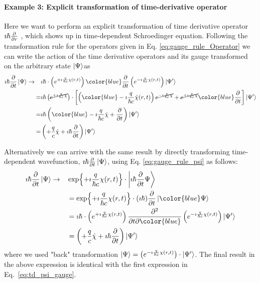 \documentclass[11pt]{article}
\begin{document}
\paragraph{Example 3: Explicit transformation of time-derivative operator}

Here we want to perform an explicit transformation of time derivative operator $\imath \hbar \pdv{}{r}$ , which shows up  in time-dependent  Schroedinger equation.
 Following the     transformation rule for the operators given in Eq. \ref{eq:gauge_rule_Operator} we can write  the action of the time derivative operators and its gauge transformed  on the arbitrary state  $\ket{\Psi}$as 
\begin{align}
 \label{eq:td_psi_gauge}  \imath \hbar \pdv{}{t} \ket{\Psi} \to \quad&
       \imath \hbar \cdot  \left( e^{+\imath \frac{q}{\hbar c} \chi(r,t)} \right) {\color{blue} \pdv{}{t} } \left( e^{-\imath \frac{q}{\hbar c} \chi(r,t)}  \right)  \ket{\Psi'}\\ \nonumber
=& \imath \hbar\left( \cancel{ e^{+\imath \frac{q}{\hbar c} \chi }} \right) \cdot
       \left[ \left({\color{blue} -\imath \frac{q}{\hbar c} \dot \chi(r,t)  }\right) \cancel{ e^{-\imath \frac{q}{\hbar c} \chi}}  + \cancel{e^{+\imath \frac{q}{\hbar c} \chi}} {\color{blue} \pdv{}{t} }  \right] \ket{\Psi'} \\ \nonumber
=& \imath \hbar\left({\color{blue} -\imath \frac{q}{\hbar c} \dot \chi +\pdv{}{t} }   \right) \ket{\Psi'}  \\ \nonumber 
=& \left( +\frac{q}{c} \dot \chi + \imath \hbar \pdv{}{t} \right) \ket{ \Psi'}
\end{align}

Alternatively we can arrive with the same result by directly transforming  time-dependent wavefunction, $\imath \hbar\pdv{}{t}\ket{\Psi}$, using Eq. \ref{eq:gauge_rule_psi} as follows:
\begin{align*}
   \imath \hbar \pdv{}{t} \ket{\Psi} \to \quad&
 \exp{+\imath \frac{q}{\hbar c} \chi(r,t)}  \cdot \ket{ \imath \hbar \pdv{}{t} \Psi }  \\ 
 & =\exp{+\imath \frac{q}{\hbar c} \chi(r,t)} \cdot (\imath \hbar) \pdv{}{t} \ket{\color{blue}\Psi} 
\\&  =  %
       \imath \hbar \cdot  \left( e^{+\imath \frac{q}{\hbar c} \chi(r,t)} \right)  \pdv{}{t}  \color{blue}  \left( e^{-\imath \frac{q}{\hbar c} \chi(r,t)}  \right)  \ket{\Psi'}\\
&= \left( +\frac{q}{c} \dot \chi + \imath \hbar \pdv{}{t} \right) \ket{ \Psi'}      
\end{align*}   
where we used "back" transformation $\ket{\Psi}=\left( e^{-\imath \frac{q}{\hbar c} \chi(r,t)}  \right) \cdot \ket{\Psi'}$.
The final result in the above expression is identical with the first expression in   Eq.~\ref{eq:td_psi_gauge}.
\end{document}
